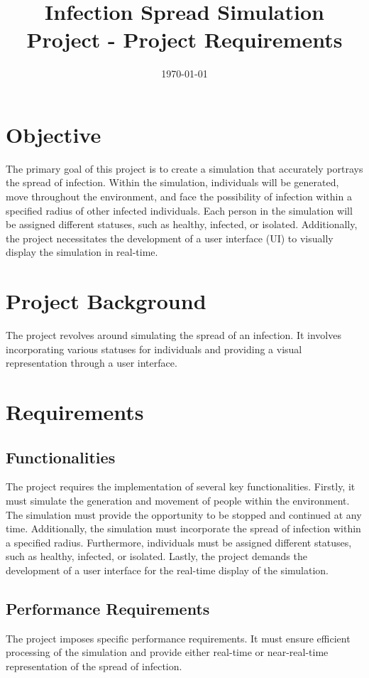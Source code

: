 \documentclass{article}
\begin{document}
	\title{Infection Spread Simulation Project - Project Requirements}
	\author{}
	\date{\today}
	\maketitle
	\newpage
	\tableofcontents
	\newpage
	
	\section{Objective}
	The primary goal of this project is to create a simulation that accurately portrays the spread of infection. Within the simulation, individuals will be generated, move throughout the environment, and face the possibility of infection within a specified radius of other infected individuals. Each person in the simulation will be assigned different statuses, such as healthy, infected, or isolated. Additionally, the project necessitates the development of a user interface (UI) to visually display the simulation in real-time.
	
	\section{Project Background}
	The project revolves around simulating the spread of an infection. It involves incorporating various statuses for individuals and providing a visual representation through a user interface.
	
	\section{Requirements}
	
	\subsection{Functionalities}
	The project requires the implementation of several key functionalities. Firstly, it must simulate the generation and movement of people within the environment. The simulation must provide the opportunity to be stopped and continued at any time. Additionally, the simulation must incorporate the spread of infection within a specified radius. Furthermore, individuals must be assigned different statuses, such as healthy, infected, or isolated. Lastly, the project demands the development of a user interface for the real-time display of the simulation.
	
	\subsection{Performance Requirements}
	The project imposes specific performance requirements. It must ensure efficient processing of the simulation and provide either real-time or near-real-time representation of the spread of infection.
	
\end{document}
